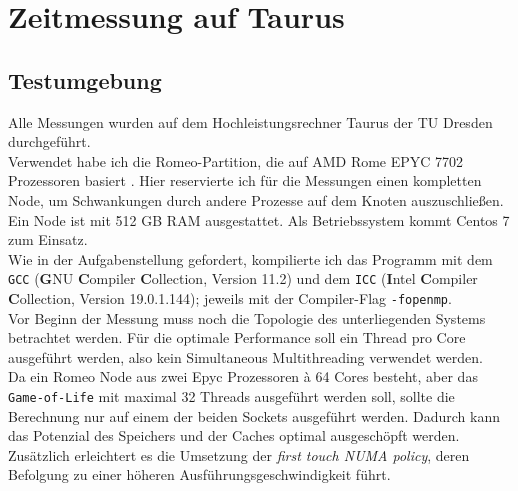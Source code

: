 \documentclass[german,plainarticle,hyperref,utf8]{zihpub}
\begin{document}
	\section{Zeitmessung auf Taurus}
	\subsection{Testumgebung} \label{umgebung}
	Alle Messungen wurden auf dem Hochleistungsrechner Taurus der TU Dresden durchgeführt.\\
	Verwendet habe ich die Romeo-Partition, die auf AMD Rome EPYC 7702 Prozessoren basiert \cite{hpc}. Hier reservierte ich für die Messungen einen kompletten Node, um Schwankungen durch andere Prozesse auf dem Knoten auszuschließen. Ein Node ist mit 512 GB RAM ausgestattet. Als Betriebssystem kommt Centos 7 zum Einsatz.\\
	Wie in der Aufgabenstellung gefordert, kompilierte ich das Programm mit dem \texttt{GCC} (\textbf{G}NU \textbf{C}ompiler \textbf{C}ollection, Version 11.2) und dem \texttt{ICC} (\textbf{I}ntel \textbf{C}ompiler \textbf{C}ollection, Version 19.0.1.144); jeweils mit der Compiler-Flag \texttt{-fopenmp}.\\
	
	Vor Beginn der Messung muss noch die Topologie des unterliegenden Systems betrachtet werden. Für die optimale Performance soll ein Thread pro Core ausgeführt werden, also kein Simultaneous Multithreading verwendet werden.\\
	Da ein Romeo Node aus zwei Epyc Prozessoren \`{a} 64 Cores besteht, aber das \texttt{Game-of-Life} mit maximal 32 Threads ausgeführt werden soll, sollte die Berechnung nur auf einem der beiden Sockets ausgeführt werden. Dadurch kann das Potenzial des Speichers und der Caches optimal ausgeschöpft werden. Zusätzlich erleichtert es die Umsetzung der \textit{first touch NUMA policy}, deren Befolgung zu einer höheren Ausführungsgeschwindigkeit führt.\\
	
\end{document}
